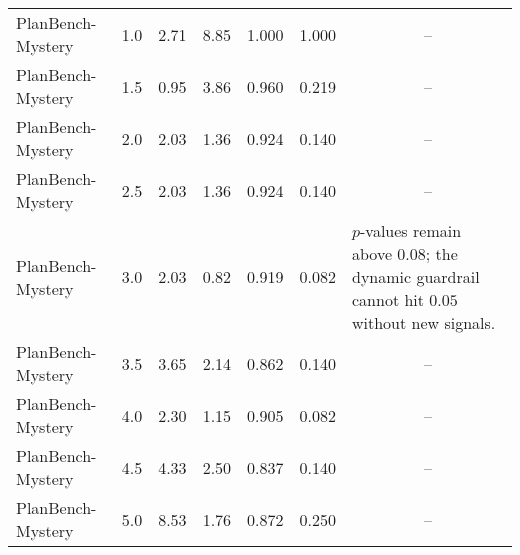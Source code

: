 {\begin{tabularx}{\textwidth}{lcccccY}
PlanBench-Mystery & 1.0 & 2.71 & 8.85 & 1.000 & 1.000 & \\
PlanBench-Mystery & 1.5 & 0.95 & 3.86 & 0.960 & 0.219 & \\
PlanBench-Mystery & 2.0 & 2.03 & 1.36 & 0.924 & 0.140 & \\
PlanBench-Mystery & 2.5 & 2.03 & 1.36 & 0.924 & 0.140 & \\
PlanBench-Mystery & 3.0 & 2.03 & 0.82 & 0.919 & 0.082 & $p$-values remain above $0.08$; the dynamic guardrail cannot hit $0.05$ without new signals.\\
PlanBench-Mystery & 3.5 & 3.65 & 2.14 & 0.862 & 0.140 & \\
PlanBench-Mystery & 4.0 & 2.30 & 1.15 & 0.905 & 0.082 & \\
PlanBench-Mystery & 4.5 & 4.33 & 2.50 & 0.837 & 0.140 & \\
PlanBench-Mystery & 5.0 & 8.53 & 1.76 & 0.872 & 0.250 & \\
\bottomrule
\end{tabularx}}
